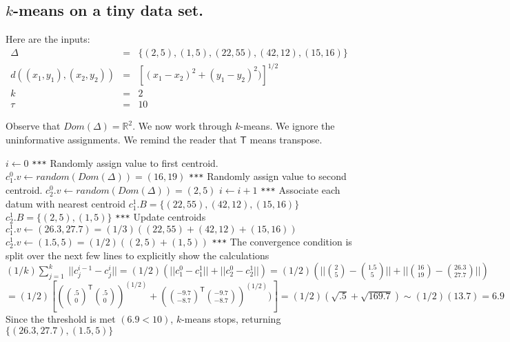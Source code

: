 \documentclass{article}
\begin{document}
\subsection*{$k$-means on a tiny data set.}
Here are the inputs:
\begin{eqnarray}
\Delta &=& \{  (2, 5),  (1,5) , (22, 55), (42, 12), (15,16)\}\\
d((x_1, y_1) ,(x_2, y_2)) &=& [(x_1-x_2)^2 + (y_1 - y_2)^2)]^{1/2}\\
k &=&2\\
\tau &=& 10
\end{eqnarray}

Observe that $Dom(\Delta) = \mathbb{R}^2$.  We now work through $k$-means. We ignore the uninformative assignments.  We remind the reader that $\mathsf{T}$ means transpose.

\begin{center}
\begin{algorithmic}[1]
\State $i \gets 0$
\State \texttt{***} Randomly assign value to first centroid.
\State $c^0_1.v \gets random(Dom(\Delta)) = (16,19)$
\State \texttt{***} Randomly assign value to second centroid.
\State $c^0_2.v \gets random(Dom(\Delta)) = (2,5)$
\State $i \gets i + 1$
\State \texttt{***} Associate each datum with nearest centroid
\State $c^1_1.B = \{(22, 55), (42, 12), (15,16)\}$
\State $c^1_2.B = \{(2,5), (1,5)\}$
\State \texttt{***} Update centroids
\State $c^1_1.v \gets (26.3, 27.7) = (1/3)((22,55) + (42,12) + (15,16))$
\State $c^1_2.v \gets (1.5, 5) = (1/2)((2,5) + (1,5))$
\State \texttt{***} The convergence condition is split over the next few lines to explicitly show the calculations
\State $(1/k)\sum_{j=1}^k~|| c^{i-1}_j-c^{i}_j|| = (1/2)(||c^0_1 - c^1_1||+ ||c^0_2 - c^1_2||) = (1/2) (||{2 \choose 5} - {1.5 \choose 5}|| + ||{16 \choose 19} - {26.3 \choose 27.7}||)$
\State $ = (1/2)[({.5 \choose 0}^{\mathsf{T}}{.5 \choose 0})^{(1/2)} + ({-9.7 \choose  -8.7}^{\mathsf{T}}{-9.7 \choose  -8.7})^{(1/2)})] = (1/2)(\sqrt{.5} + \sqrt{169.7}) \sim (1/2)(13.7) = 6.9$
\State Since the threshold is met $(6.9 < 10)$, $k$-means stops, returning $\{(26.3, 27.7), (1.5,5)\}$
\end{algorithmic}
\end{center}

\newpage
\end{document}
